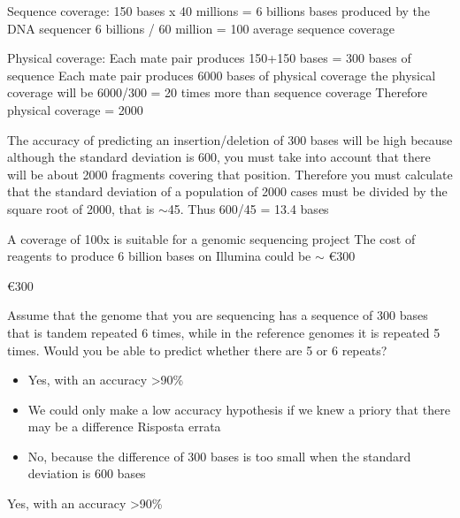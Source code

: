 \begin{Answer} [
  ref={ex30},
  number={1}
 ]

Sequence coverage:
150 bases x 40 millions = 6 billions bases produced by the DNA sequencer
6 billions / 60 million = 100 average sequence coverage

Physical coverage:
Each mate pair produces 150+150 bases = 300 bases of sequence
Each mate pair produces 6000 bases of physical coverage
the physical coverage will be 6000/300 = 20 times more than sequence coverage
Therefore physical coverage = 2000

The accuracy of predicting an insertion/deletion of 300 bases will be high
because although the standard deviation is 600, you must take into account that
there will be about 2000 fragments covering that position. Therefore you must
calculate that the standard deviation of a population of 2000 cases must be
divided by the square root of 2000, that is $\sim$45. Thus 600/45 = 13.4 bases

A coverage of 100x is suitable for a genomic sequencing project
The cost of reagents to produce 6 billion bases on Illumina could be $\sim$
\euro 300



\Question \euro 300

\end{Answer}

\begin{Exercise} [
  label={ex31},
  origin={G. Valle}
 ]

\Question Assume that the genome that you are sequencing has a sequence of 300
bases that is tandem repeated 6 times, while in the reference genomes it is
repeated 5 times. Would you be able to predict whether there are 5 or 6 repeats?
\begin{itemize}
\item Yes, with an accuracy >90\%
\item We could only make a low accuracy hypothesis if we knew a priory that
there may be a difference Risposta errata
\item No, because the difference of 300 bases is too small when the standard
deviation is 600 bases
\end{itemize}


\end{Exercise}

\begin{Answer} [
  ref={ex31},
  number={1}
 ]

\Question Yes, with an accuracy >90\%

\end{Answer}

